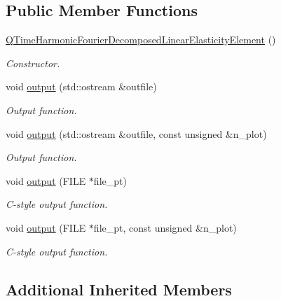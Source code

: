 \subsection*{Public Member Functions}
\begin{DoxyCompactItemize}
\item 
\hyperlink{classoomph_1_1QTimeHarmonicFourierDecomposedLinearElasticityElement_a769163dd4ee891bb58b5cda26dda3f2c}{Q\+Time\+Harmonic\+Fourier\+Decomposed\+Linear\+Elasticity\+Element} ()
\begin{DoxyCompactList}\small\item\em Constructor. \end{DoxyCompactList}\item 
void \hyperlink{classoomph_1_1QTimeHarmonicFourierDecomposedLinearElasticityElement_a8d2c88dba3a246693ba43bab9d84fbd8}{output} (std\+::ostream \&outfile)
\begin{DoxyCompactList}\small\item\em Output function. \end{DoxyCompactList}\item 
void \hyperlink{classoomph_1_1QTimeHarmonicFourierDecomposedLinearElasticityElement_a42122255353025f62a4ff73fc35db587}{output} (std\+::ostream \&outfile, const unsigned \&n\+\_\+plot)
\begin{DoxyCompactList}\small\item\em Output function. \end{DoxyCompactList}\item 
void \hyperlink{classoomph_1_1QTimeHarmonicFourierDecomposedLinearElasticityElement_afc1d5ed96b566665d0a90c79ee347028}{output} (F\+I\+LE $\ast$file\+\_\+pt)
\begin{DoxyCompactList}\small\item\em C-\/style output function. \end{DoxyCompactList}\item 
void \hyperlink{classoomph_1_1QTimeHarmonicFourierDecomposedLinearElasticityElement_aa965a2e2d7f942f43e5e668b9111e9e0}{output} (F\+I\+LE $\ast$file\+\_\+pt, const unsigned \&n\+\_\+plot)
\begin{DoxyCompactList}\small\item\em C-\/style output function. \end{DoxyCompactList}\end{DoxyCompactItemize}
\subsection*{Additional Inherited Members}


